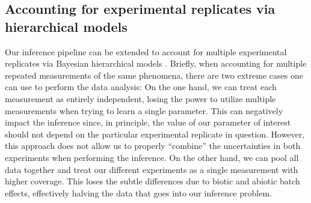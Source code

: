 \documentclass[
  letterpaper,
  DIV=11,
  numbers=noendperiod]{scrartcl}
\begin{document}
\begin{refsegment}
\begin{figure}
\end{figure}

\hypertarget{sec-replicates}{%
\subsection{Accounting for experimental replicates via hierarchical
models}\label{sec-replicates}}

Our inference pipeline can be extended to account for multiple
experimental replicates via Bayesian hierarchical models
\autocite{betancourt2013}. Briefly, when accounting for multiple
repeated measurements of the same phenomena, there are two extreme cases
one can use to perform the data analysis: On the one hand, we can treat
each measurement as entirely independent, losing the power to utilize
multiple measurements when trying to learn a single parameter. This can
negatively impact the inference since, in principle, the value of our
parameter of interest should not depend on the particular experimental
replicate in question. However, this approach does not allow us to
properly ``combine'' the uncertainties in both experiments when
performing the inference. On the other hand, we can pool all data
together and treat our different experiments as a single measurement
with higher coverage. This loses the subtle differences due to biotic
and abiotic batch effects, effectively halving the data that goes into
our inference problem.


\end{refsegment}
\end{document}
